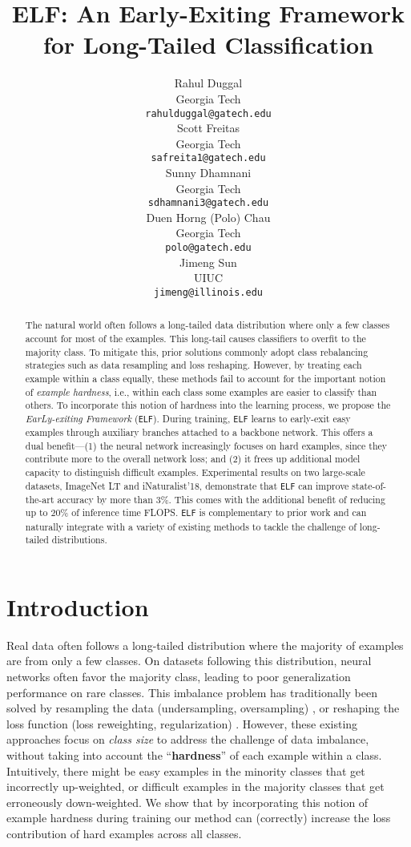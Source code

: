 \documentclass{article}
\title{ELF: An Early-Exiting Framework\\ for Long-Tailed Classification}
\author{Rahul Duggal \\
Georgia Tech \\
  \texttt{rahulduggal@gatech.edu} \\
\And
  Scott Freitas \\
  Georgia Tech \\
\texttt{safreita1@gatech.edu} \\
  \AND
  Sunny Dhamnani \\
  Georgia Tech \\
\texttt{sdhamnani3@gatech.edu} \\
  \And
  Duen Horng (Polo) Chau \\
  Georgia Tech \\
\texttt{polo@gatech.edu} \\
  \And
  Jimeng Sun \\
  UIUC \\
\texttt{jimeng@illinois.edu} \\
}
\newcommand{\method}{\texttt{ELF}\xspace}
\begin{document}
\maketitle

\begin{abstract}

The natural world often follows a long-tailed data distribution where only a few classes account for most of the examples. 
This long-tail causes classifiers to overfit to the majority class.
To mitigate this, prior solutions commonly adopt class rebalancing strategies such as data resampling and loss reshaping. 
However, by treating each example within a class equally, these methods fail to account for the important notion of \textit{example hardness}, i.e., within each class some examples are easier to classify than others.
To incorporate this notion 
of hardness
into the learning process, we propose the \textit{EarLy-exiting Framework} (\method{}). 
During training, \method{} learns to early-exit easy examples through auxiliary branches attached to a backbone network. 
This offers a dual benefit---(1) the neural network increasingly focuses on hard examples, since they contribute more to the overall network loss; and (2) it frees up additional model capacity to distinguish difficult examples. 
Experimental results on two large-scale datasets, ImageNet LT and iNaturalist'18, demonstrate that \method{} can improve state-of-the-art accuracy by more than 3\%.
This comes with the additional benefit of reducing up to 20\% of inference time FLOPS. 
\method{} is complementary to prior work and can naturally integrate with a variety of existing methods to tackle the challenge of long-tailed distributions. 


\end{abstract}


\section{Introduction}
Real data often follows a long-tailed distribution where the majority of examples are from only a few classes.
On datasets following this distribution, neural networks often favor the majority class, leading to poor generalization performance on rare classes.
This imbalance problem has traditionally been solved by resampling the data (undersampling, oversampling) \cite{zhou2019bbn,kang2019decoupling,peng2019trainable,chawla2002smote,he2008adasyn}, or reshaping the loss function (loss reweighting, regularization) \cite{cui2019class,cao2019learning}. 
However, these existing approaches focus on \textit{class size} to address the challenge of data imbalance, without taking into account the ``\textbf{hardness}'' of each example within a class.
Intuitively, there might be easy examples in the minority classes that get incorrectly up-weighted, or difficult examples in the majority classes that get erroneously down-weighted. 
We show that by incorporating this notion of example hardness during training our method can (correctly) increase the loss contribution of hard examples across all classes. 
\end{document}
